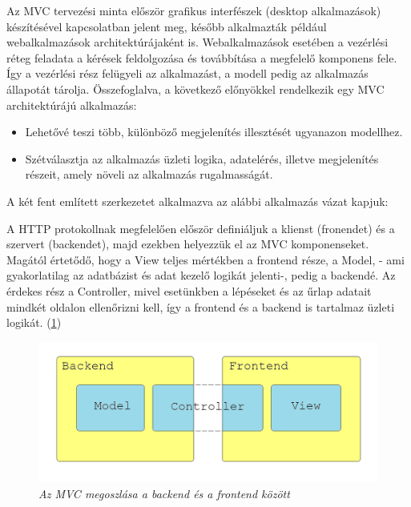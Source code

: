 
Az MVC tervezési minta először grafikus interfészek (desktop alkalmazások) készítésével kapcsolatban jelent meg, később alkalmazták például webalkalmazások architektúrájaként is. Webalkalmazások esetében a vezérlési réteg feladata a kérések feldolgozása és továbbítása a megfelelő komponens fele. Így a vezérlési rész felügyeli az alkalmazást, a modell pedig az alkalmazás állapotát tárolja. Összefoglalva, a következő előnyökkel rendelkezik egy MVC architektúrájú alkalmazás:
\begin{itemize}
	\item Lehetővé teszi több, különböző megjelenítés illesztését ugyanazon modellhez.
	\item Szétválasztja az alkalmazás üzleti logika, adatelérés, illetve megjelenítés részeit, amely növeli az alkalmazás rugalmasságát. \cite{java-web-tech}
\end{itemize}


A két fent említett szerkezetet alkalmazva az alábbi alkalmazás vázat kapjuk:

A HTTP protokollnak megfelelően először definiáljuk a klienst (fronendet) és a szervert (backendet), majd ezekben helyezzük el az MVC komponenseket. Magától értetődő, hogy a View teljes mértékben a frontend része, a Model, - ami gyakorlatilag az adatbázist és adat kezelő logikát jelenti-, pedig a backendé. Az érdekes rész a Controller, mivel esetünkben a lépéseket és az űrlap adatait mindkét oldalon ellenőrizni kell, így a frontend és a backend is tartalmaz üzleti logikát. (\ref{fig:mixed-arch})
\begin{figure}[!h]
	\centering
	\includegraphics[width=0.5\linewidth]{kepek/mixed-arch.png}
	\caption{\textit{Az MVC megoszlása a backend és a frontend között}}
	\label{fig:mixed-arch}
\end{figure}

